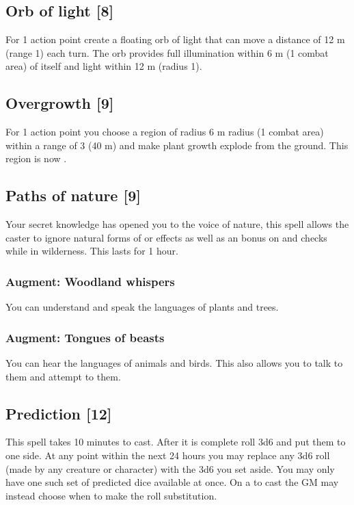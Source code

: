 \subsection{Orb of light [8]}
\label{spell:orb-light}
For 1 action point create a floating orb of light that can move a distance of 12 m (range 1) each turn. The orb provides full illumination within 6 m (1 combat area) of itself and  light within 12 m (radius 1).

\subsection{Overgrowth [9]}
\label{spell:overgrowth}
For 1 action point you choose a region of radius 6 m radius (1 combat area) within a range of 3 (40 m) and make plant growth explode from the ground. This region is now .

\subsection{Paths of nature [9]}
Your secret knowledge has opened you to the voice of nature, this spell allows the caster to ignore natural forms of  or  effects as well as an  bonus on  and  checks while in wilderness. This lasts for 1 hour.
\subsubsection{Augment: Woodland whispers}
You can understand and speak the languages of plants and trees.
\subsubsection{Augment: Tongues of beasts}
You can hear the languages of animals and birds. This also allows you to talk to them and attempt to  them.

\subsection{Prediction [12]}
This spell takes 10 minutes to cast. After it is complete roll 3d6 and put them to one side. At any point within the next 24 hours you may replace any 3d6 roll (made by any creature or character) with the 3d6 you set aside. You may only have one such set of predicted dice available at once. On a  to cast the GM may instead choose when to make the roll substitution.
